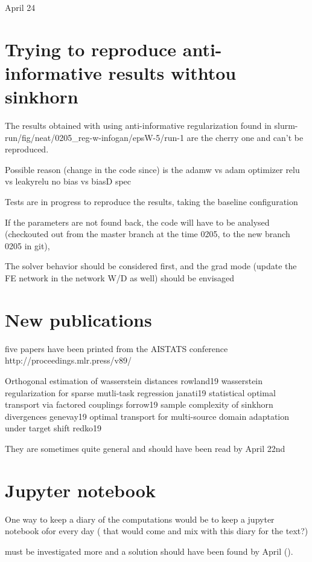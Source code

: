 \documentclass[11pt,a4paper]{article}
\begin{document}

{\Huge April 24}

\section{Trying to reproduce anti-informative results withtou sinkhorn}

The results obtained with using anti-informative regularization found in
slurm-run/fig/neat/0205_reg-w-infogan/epsW-5/run-1 are the cherry one and can't
be reproduced.

Possible reason (change in the code since) is the adamw vs adam optimizer
relu vs leakyrelu
no bias vs biasD spec

Tests are in progress to reproduce the results, taking the baseline
configuration

If the parameters are not found back, the code will have to be analysed
(checkouted out from the master branch at the time 0205, to the new branch 0205
in git),

The solver behavior should be considered first, and the grad mode (update the FE
network in the network W/D as well) should be envisaged

\section{New publications}

five papers have been printed from the AISTATS conference
http://proceedings.mlr.press/v89/

Orthogonal estimation of wasserstein distances rowland19
wasserstein regularization for sparse mutli-task regression janati19
statistical optimal transport via factored couplings forrow19
sample complexity of sinkhorn divergences genevay19
optimal transport for multi-source domain adaptation under target shift redko19

They are sometimes quite general and should have been read by April 22nd

\section{Jupyter notebook}

One way to keep a diary of the computations would be to keep a jupyter notebook
ofor every day ( that would come and mix with this diary for the text?)

must be investigated more and a solution should have been found by April  ().
\end{document}
